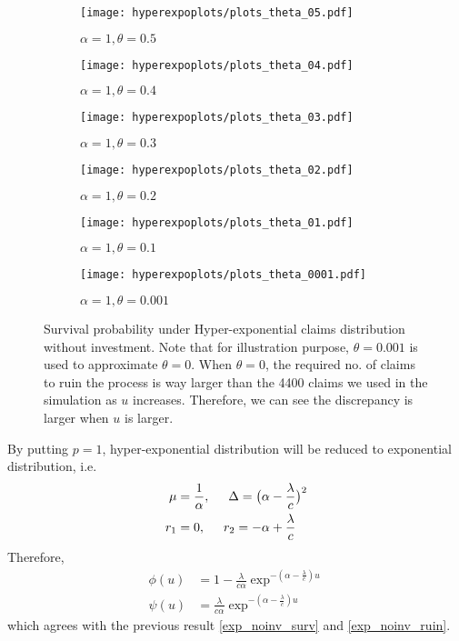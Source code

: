 \documentclass[12pt]{article}
\begin{document}
\begin{figure}[!htbp]
\begin{subfigure}{0.5\textwidth}
\texttt{[image: hyperexpoplots/plots\_theta\_05.pdf]} 
\caption{\(\alpha=1, \theta=0.5\)}
\label{hyperexp_noinv_theta05}
\end{subfigure}
\begin{subfigure}{0.5\textwidth}
\texttt{[image: hyperexpoplots/plots\_theta\_04.pdf]} 
\caption{\(\alpha=1, \theta=0.4\)}
\label{hyperexp_noinv_theta04}
\end{subfigure}
\begin{subfigure}{0.5\textwidth}
\texttt{[image: hyperexpoplots/plots\_theta\_03.pdf]} 
\caption{\(\alpha=1, \theta=0.3\)}
\label{hyperexp_noinv_theta03}
\end{subfigure}
\begin{subfigure}{0.5\textwidth}
\texttt{[image: hyperexpoplots/plots\_theta\_02.pdf]} 
\caption{\(\alpha=1, \theta=0.2\)}
\label{hyperexp_noinv_theta02}
\end{subfigure}
\begin{subfigure}{0.5\textwidth}
\texttt{[image: hyperexpoplots/plots\_theta\_01.pdf]} 
\caption{\(\alpha=1, \theta=0.1\)}
\label{hyperexp_noinv_theta01}
\end{subfigure}
\begin{subfigure}{0.5\textwidth}
\texttt{[image: hyperexpoplots/plots\_theta\_0001.pdf]} 
\caption{\(\alpha=1, \theta=0.001\)}
\label{hyperexp_noinv_theta0}
\end{subfigure}
\vspace{-10pt}
\caption{Survival probability under Hyper-exponential claims distribution without investment. Note that for illustration purpose, \(\theta=0.001\) is used to approximate \(\theta=0\). When \(\theta=0\), the required no. of claims to ruin the process is way larger than the 4400 claims we used in the simulation as \(u\) increases. Therefore, we can see the discrepancy is larger when \(u\) is larger.}
\vspace{-10pt}
\label{fig:hyperexpo-noinv-part}
\end{figure}
\newline
By putting \(p=1\), hyper-exponential distribution will be reduced to exponential distribution, i.e.
\begin{align*}
    \mu&=\frac{1}{\alpha},
    \hspace{0.5cm}
    \Delta=\big(\alpha-\frac{\lambda}{c}\big)^2\\
    r_1&=0,
    \hspace{0.5cm}
    r_2=-\alpha+\frac{\lambda}{c}
\end{align*}
Therefore,
\begin{align}
    \phi(u)&=1-\frac{\lambda}{c\alpha}\exp^{-(\alpha-\frac{\lambda}{c})u}
    \label{hyper-exp-surv}\\
    \psi(u)&=\frac{\lambda}{c\alpha}\exp^{-(\alpha-\frac{\lambda}{c})u}
    \label{hyper-exp-ruin}
\end{align}
which agrees with the previous result \eqref{exp_noinv_surv} and \eqref{exp_noinv_ruin}.
\end{document}
